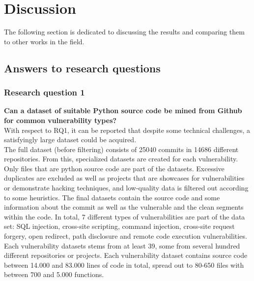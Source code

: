 \documentclass[
a4paper,
pagesize,
pdftex,
12pt,
twoside, %
BCOR=5mm, %
ngerman,
fleqn,
final,
]{scrartcl}
\begin{document}
	\section{Discussion}\label{Discussion}
	The following section is dedicated to discussing the results and comparing them to other works in the field. 
	
	\subsection{Answers to research questions}
	
	\subsubsection{Research question 1}
	\textbf{Can a dataset of suitable Python source code be mined from Github for common vulnerability types?}\\
	With respect to RQ1, it can be reported that despite some technical challenges, a satisfyingly large dataset could be acquired.\\
	The full dataset (before filtering) consists of 25040 commits in 14686 different repositories. From this, specialized datasets are created for each vulnerability. Only files that are python source code are part of the datasets. Excessive duplicates are excluded as well as projects that are showcases for vulnerabilities or demonstrate hacking techniques, and low-quality data is filtered out according to some heuristics. The final datasets contain the source code and some information about the commit as well as the vulnerable and the clean segments within the code. In total, 7 different types of vulnerabilities are part of the data set: SQL injection, cross-site scripting, command injection, cross-site request forgery, open redirect, path disclosure and remote code execution vulnerabilities.\\
	Each vulnerability datasets stems from at least 39, some from several hundred different repositories or projects. Each vulnerability dataset contains source code between 14.000 and 83.000 lines of code in total, spread out to 80-650 files with between 700 and 5.000 functions.\\ 
	
\end{document}
